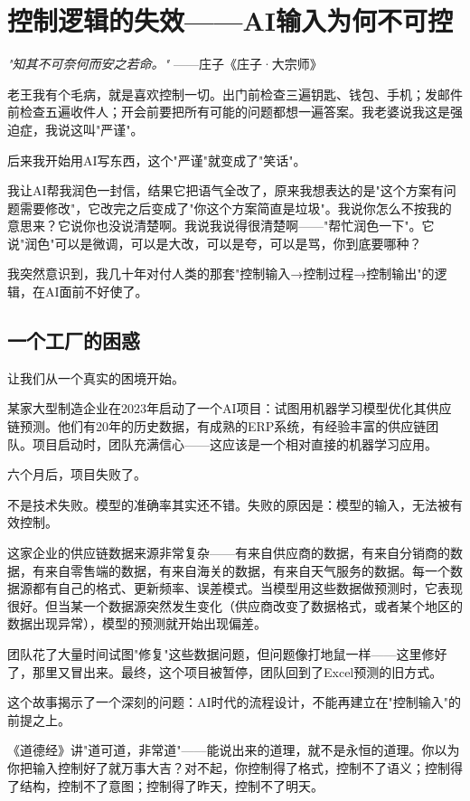 \chapter{控制逻辑的失效——AI输入为何不可控}


\textit{"知其不可奈何而安之若命。"}
——庄子《庄子·大宗师》


老王我有个毛病，就是喜欢控制一切。出门前检查三遍钥匙、钱包、手机；发邮件前检查五遍收件人；开会前要把所有可能的问题都想一遍答案。我老婆说我这是强迫症，我说这叫"严谨"。

后来我开始用AI写东西，这个"严谨"就变成了"笑话"。

我让AI帮我润色一封信，结果它把语气全改了，原来我想表达的是"这个方案有问题需要修改"，它改完之后变成了"你这个方案简直是垃圾"。我说你怎么不按我的意思来？它说你也没说清楚啊。我说我说得很清楚啊——"帮忙润色一下"。它说"润色"可以是微调，可以是大改，可以是夸，可以是骂，你到底要哪种？

我突然意识到，我几十年对付人类的那套"控制输入→控制过程→控制输出"的逻辑，在AI面前不好使了。

\section{一个工厂的困惑}


让我们从一个真实的困境开始。

某家大型制造企业在2023年启动了一个AI项目：试图用机器学习模型优化其供应链预测。他们有20年的历史数据，有成熟的ERP系统，有经验丰富的供应链团队。项目启动时，团队充满信心——这应该是一个相对直接的机器学习应用。

六个月后，项目失败了。

不是技术失败。模型的准确率其实还不错。失败的原因是：模型的输入，无法被有效控制。

这家企业的供应链数据来源非常复杂——有来自供应商的数据，有来自分销商的数据，有来自零售端的数据，有来自海关的数据，有来自天气服务的数据。每一个数据源都有自己的格式、更新频率、误差模式。当模型用这些数据做预测时，它表现很好。但当某一个数据源突然发生变化（供应商改变了数据格式，或者某个地区的数据出现异常），模型的预测就开始出现偏差。

团队花了大量时间试图"修复"这些数据问题，但问题像打地鼠一样——这里修好了，那里又冒出来。最终，这个项目被暂停，团队回到了Excel预测的旧方式。

这个故事揭示了一个深刻的问题：AI时代的流程设计，不能再建立在"控制输入"的前提之上。

《道德经》讲"道可道，非常道"——能说出来的道理，就不是永恒的道理。你以为你把输入控制好了就万事大吉？对不起，你控制得了格式，控制不了语义；控制得了结构，控制不了意图；控制得了昨天，控制不了明天。

